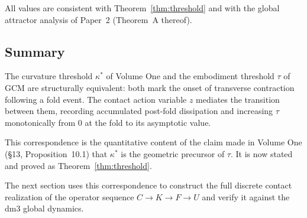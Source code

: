 All values are consistent with Theorem~\ref{thm:threshold}
and with the global attractor analysis of Paper~2 (Theorem~A
thereof).

\subsection{Summary}
\label{subsec:section3-summary}

The curvature threshold $\kappa^*$ of Volume One and the
embodiment threshold $\tau$ of GCM are structurally equivalent:
both mark the onset of transverse contraction following a
fold event. The contact action variable $z$ mediates the
transition between them, recording accumulated post-fold
dissipation and increasing $\tau$ monotonically from $0$ at
the fold to its asymptotic value.

This correspondence is the quantitative content of the claim
made in Volume One (\S13, Proposition~10.1) that $\kappa^*$
is the geometric precursor of $\tau$. It is now stated and
proved as Theorem~\ref{thm:threshold}.

The next section uses this correspondence to construct the
full discrete contact realization of the operator sequence
$C\to K\to F\to U$ and verify it against the dm3 global
dynamics.
